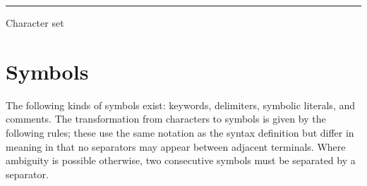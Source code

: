 \documentclass{overturerepchap}
\begin{document}
{\begin{table}[ht]
\rule{\textwidth}{.5mm}
\hypertarget{charSetTable}{\caption{Character set}}
\label{charSetTable}

\end{table}



\clearpage %


\section{Symbols}\label{Symbols}

The following kinds of symbols exist: keywords, delimiters,
symbolic literals, and comments.  The transformation from characters to
symbols is given by the following rules; these use the same notation as the
syntax definition but differ in meaning in that no separators may appear
between adjacent terminals.  Where ambiguity is possible otherwise, two
consecutive symbols must be separated by a separator.

}
\end{document}
